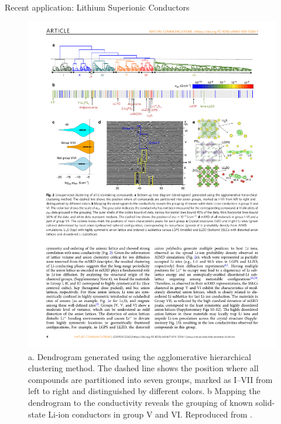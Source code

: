 \documentclass[aspectratio=169]{beamer}
\begin{document}
\begin{frame}{Recent application: Lithium Superionic Conductors}
\begin{figure}
    \centering
    \includegraphics[width=\textwidth]{figures/hirerachicalclustering-superionicconductors.pdf}
    \caption{a. Dendrogram generated using the agglomerative hierarchical clustering method. The dashed line shows the position where all compounds are partitioned into seven groups, marked as I–VII from left to right and distinguished by different colors. b Mapping the dendrogram to the conductivity reveals the grouping of known solid-state Li-ion conductors in group V and VI. Reproduced from \cite{zhangUnsupervisedDiscoverySolidstate2019}.}
\end{figure}
\end{frame}
\end{document}
